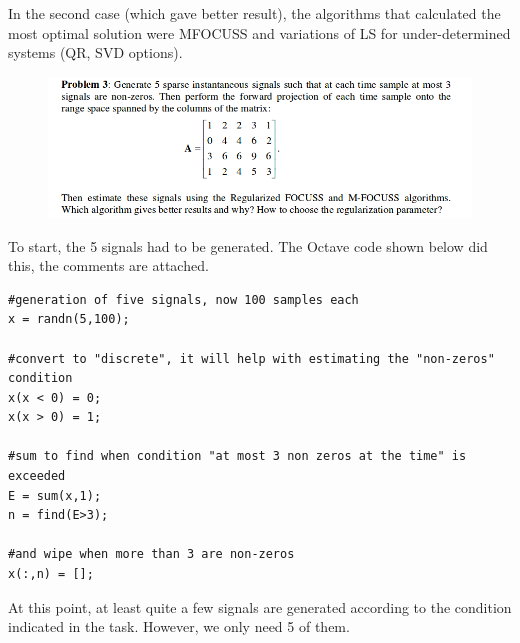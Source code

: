 \documentclass[eng,openany]{mgr}
\begin{document}
In the second case (which gave better result), the algorithms that calculated the most optimal solution were MFOCUSS and variations of LS for under-determined systems (QR, SVD options). \newpage
\begin{figure}[h]
\centering
\includegraphics[width=0.7\linewidth]{screenshot003}
\label{fig:screenshot003}
\end{figure}
To start, the 5 signals had to be generated. The Octave code shown below did this, the comments are attached.
\begin{lstlisting}
#generation of five signals, now 100 samples each
x = randn(5,100);

#convert to "discrete", it will help with estimating the "non-zeros" condition
x(x < 0) = 0;
x(x > 0) = 1;

#sum to find when condition "at most 3 non zeros at the time" is exceeded
E = sum(x,1);
n = find(E>3);

#and wipe when more than 3 are non-zeros
x(:,n) = [];
\end{lstlisting}
At this point, at least quite a few signals are generated according to the condition indicated in the task. However, we only need 5 of them.
\end{document}
